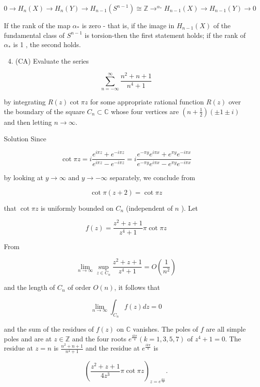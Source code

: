\documentclass[10pt]{article}
\begin{document}
$$
0 \rightarrow H_{n}(X) \rightarrow H_{n}(Y) \rightarrow H_{n-1}\left(S^{n-1}\right) \cong \mathbb{Z} \rightarrow^{\alpha_{*}} H_{n-1}(X) \rightarrow H_{n-1}(Y) \rightarrow 0
$$

If the rank of the map $\alpha_{*}$ is zero - that is, if the image in $H_{n-1}(X)$ of the fundamental class of $S^{n-1}$ is torsion-then the first statement holds; if the rank of $\alpha_{*}$ is 1 , the second holds.

\begin{enumerate}
  \setcounter{enumi}{3}
  \item (CA) Evaluate the series
\end{enumerate}

$$
\sum_{n=-\infty}^{\infty} \frac{n^{2}+n+1}{n^{4}+1}
$$

by integrating $R(z) \cot \pi z$ for some appropriate rational function $R(z)$ over the boundary of the square $C_{n} \subset \mathbb{C}$ whose four vertices are $\left(n+\frac{1}{2}\right)( \pm 1 \pm i)$ and then letting $n \rightarrow \infty$.

Solution Since

$$
\cot \pi z=i \frac{e^{i \pi z}+e^{-i \pi z}}{e^{i \pi z}-e^{-i \pi z}}=i \frac{e^{-\pi y} e^{i \pi x}+e^{\pi y} e^{-i \pi x}}{e^{-\pi y} e^{i \pi x}-e^{\pi y} e^{-i \pi x}}
$$

by looking at $y \rightarrow \infty$ and $y \rightarrow-\infty$ separately, we conclude from

$$
\cot \pi(z+2)=\cot \pi z
$$

that $\cot \pi z$ is uniformly bounded on $C_{n}$ (independent of $n$ ). Let

$$
f(z)=\frac{z^{2}+z+1}{z^{4}+1} \pi \cot \pi z
$$

From

$$
\lim _{n \rightarrow \infty} \sup _{z \in C_{n}} \frac{z^{2}+z+1}{z^{4}+1}=O\left(\frac{1}{n^{2}}\right)
$$

and the length of $C_{n}$ of order $O(n)$, it follows that

$$
\lim _{n \rightarrow \infty} \int_{C_{n}} f(z) d z=0
$$

and the sum of the residues of $f(z)$ on $\mathbb{C}$ vanishes. The poles of $f$ are all simple poles and are at $z \in \mathbb{Z}$ and the four roots $e^{\frac{i k \pi}{4}}(k=1,3,5,7)$ of $z^{4}+1=0$. The residue at $z=n$ is $\frac{n^{2}+n+1}{n^{4}+1}$ and the residue at $e^{\frac{i k \pi}{4}}$ is

$$
\left(\frac{z^{2}+z+1}{4 z^{3}} \pi \cot \pi z\right)_{z=e^{\frac{i k \pi}{4}}} .
$$
\end{document}
